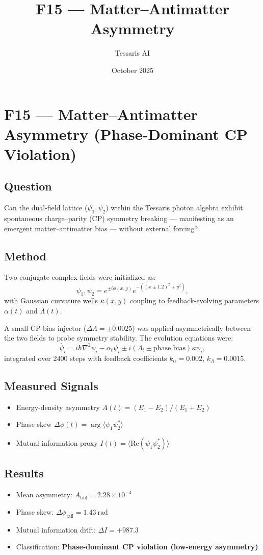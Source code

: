 \documentclass{article}
\title{F15 — Matter–Antimatter Asymmetry}
\author{Tessaris AI}
\date{October 2025}
\begin{document}
\maketitle

\section*{F15 — Matter–Antimatter Asymmetry (Phase-Dominant CP Violation)}

\subsection*{Question}
Can the dual-field lattice (\(\psi_1, \psi_2\)) within the Tessaris photon algebra exhibit spontaneous charge–parity (CP) symmetry breaking — manifesting as an emergent matter–antimatter bias — without external forcing?

\subsection*{Method}
Two conjugate complex fields were initialized as:
\[
\psi_1, \psi_2 = e^{\pm i \phi(x,y)} e^{-((x\pm1.2)^2 + y^2)},
\]
with Gaussian curvature wells \(\kappa(x,y)\) coupling to feedback-evolving parameters \(\alpha(t)\) and \(\Lambda(t)\).

A small CP-bias injector (\(\Delta\Lambda = \pm 0.0025\)) was applied asymmetrically between the two fields to probe symmetry stability.  
The evolution equations were:
\[
\dot{\psi_i} = i\hbar\nabla^2\psi_i - \alpha_t \psi_i \pm i(\Lambda_t \pm \text{phase\_bias})\kappa \psi_i,
\]
integrated over 2400 steps with feedback coefficients
\(k_\alpha = 0.002\), \(k_\Lambda = 0.0015\).

\subsection*{Measured Signals}
\begin{itemize}
  \item Energy-density asymmetry \(A(t) = (E_1 - E_2)/(E_1 + E_2)\)
  \item Phase skew \(\Delta\phi(t) = \arg\langle \psi_1 \psi_2^* \rangle\)
  \item Mutual information proxy \(I(t) = \langle \mathrm{Re}(\psi_1 \psi_2^*) \rangle\)
\end{itemize}

\subsection*{Results}
\begin{itemize}
  \item Mean asymmetry: \(A_{\text{tail}} = 2.28\times10^{-4}\)
  \item Phase skew: \(\Delta\phi_{\text{tail}} = 1.43~\text{rad}\)
  \item Mutual information drift: \(\Delta I = +987.3\)
  \item Classification: \textbf{Phase-dominant CP violation (low-energy asymmetry)}
\end{itemize}
\end{document}
